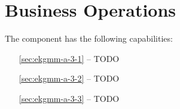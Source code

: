 \chapter{Business Operations}\label{ch:ekgmm-a-3} %

The  component has the following capabilities:

\begin{itemize}[leftmargin=.5in]
  \item [\ref{sec:ekgmm-a-3-1}]  -- TODO
  \item [\ref{sec:ekgmm-a-3-2}]  -- TODO
  \item [\ref{sec:ekgmm-a-3-3}]  -- TODO
\end{itemize}




